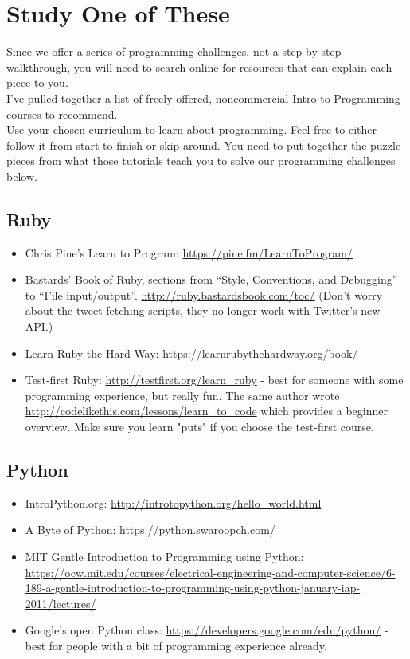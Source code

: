 \documentclass{42-en}
\begin{document}
\chapter{Study One of These}

Since we offer a series of programming challenges, not a step by step walkthrough, you will need to search online for resources that can explain each piece to you.\\

I've pulled together a list of freely offered, noncommercial Intro to Programming courses to recommend.\\

Use your chosen curriculum to learn about programming. Feel free to either follow it from start to finish or skip around. You need to put together the puzzle pieces from what those tutorials teach you to solve our programming challenges below.

\section{Ruby}

\begin{itemize}

	\item Chris Pine’s Learn to Program: \url{https://pine.fm/LearnToProgram/}
	\item Bastards’ Book of Ruby, sections from “Style, Conventions, and Debugging” to “File input/output”. \url{http://ruby.bastardsbook.com/toc/} (Don’t worry about the tweet fetching scripts, they no longer work with Twitter’s new API.)
	\item Learn Ruby the Hard Way: \url{https://learnrubythehardway.org/book/}
	\item Test-first Ruby: \url{http://testfirst.org/learn_ruby} - best for someone with some programming experience, but really fun. The same author wrote \url{http://codelikethis.com/lessons/learn_to_code} which provides a beginner overview. Make sure you learn "puts" if you choose the test-first course.

\end{itemize}

\section{Python}

\begin{itemize}

	\item IntroPython.org: \url{http://introtopython.org/hello_world.html}
	\item A Byte of Python: \url{https://python.swaroopch.com/}
	\item MIT Gentle Introduction to Programming using Python: \url{https://ocw.mit.edu/courses/electrical-engineering-and-computer-science/6-189-a-gentle-introduction-to-programming-using-python-january-iap-2011/lectures/}
	\item Google’s open Python class: \url{https://developers.google.com/edu/python/} - best for people with a bit of programming experience already.

\end{itemize}
\end{document}
